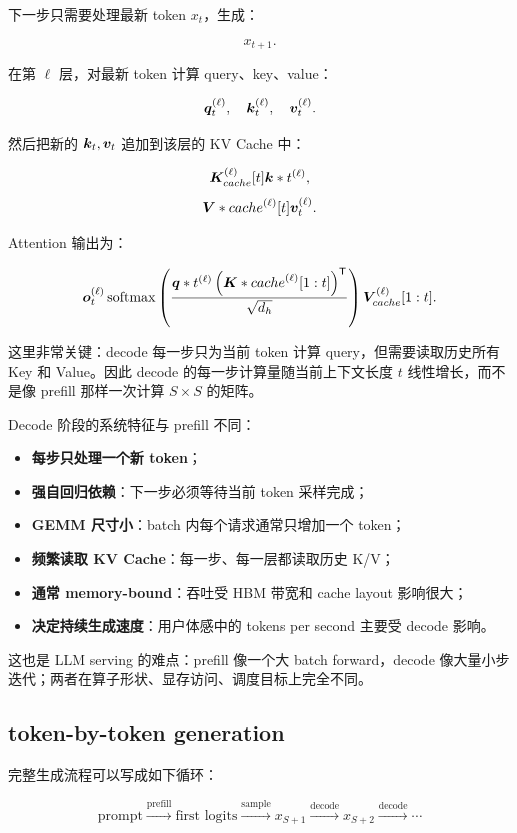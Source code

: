 下一步只需要处理最新 token $x_t$，生成：

\[
x_{t+1}.
\]

在第 $\ell$ 层，对最新 token 计算 query、key、value：

\[
\bm{q}_t^{(\ell)},
\quad
\bm{k}_t^{(\ell)},
\quad
\bm{v}_t^{(\ell)}.
\]

然后把新的 $\bm{k}_t,\bm{v}_t$ 追加到该层的 KV Cache 中：

\[
\bm{K}_{cache}^{(\ell)}[t]
\bm{k}*t^{(\ell)},
\]
\[
\bm{V}*{cache}^{(\ell)}[t]
\bm{v}_t^{(\ell)}.
\]

Attention 输出为：

\[
\bm{o}_t^{(\ell)}
\operatorname{softmax}
\left(
\frac{
\bm{q}*t^{(\ell)}
\left(\bm{K}*{cache}^{(\ell)}[1:t]\right)^{\mathsf{T}}
}
{\sqrt{d_h}}
\right)
\bm{V}_{cache}^{(\ell)}[1:t].
\]

这里非常关键：decode 每一步只为当前 token 计算 query，但需要读取历史所有 Key 和 Value。因此 decode 的每一步计算量随当前上下文长度 $t$ 线性增长，而不是像 prefill 那样一次计算 $S\times S$ 的矩阵。

Decode 阶段的系统特征与 prefill 不同：

\begin{itemize}
\item \textbf{每步只处理一个新 token}；
\item \textbf{强自回归依赖}：下一步必须等待当前 token 采样完成；
\item \textbf{GEMM 尺寸小}：batch 内每个请求通常只增加一个 token；
\item \textbf{频繁读取 KV Cache}：每一步、每一层都读取历史 K/V；
\item \textbf{通常 memory-bound}：吞吐受 HBM 带宽和 cache layout 影响很大；
\item \textbf{决定持续生成速度}：用户体感中的 tokens per second 主要受 decode 影响。
\end{itemize}

这也是 LLM serving 的难点：prefill 像一个大 batch forward，decode 像大量小步迭代；两者在算子形状、显存访问、调度目标上完全不同。

\subsection{token-by-token generation}
\label{subsec:token-by-token-generation}

完整生成流程可以写成如下循环：

\[
\text{prompt}
\xrightarrow{\text{prefill}}
\text{first logits}
\xrightarrow{\text{sample}}
x_{S+1}
\xrightarrow{\text{decode}}
x_{S+2}
\xrightarrow{\text{decode}}
\cdots
\]

